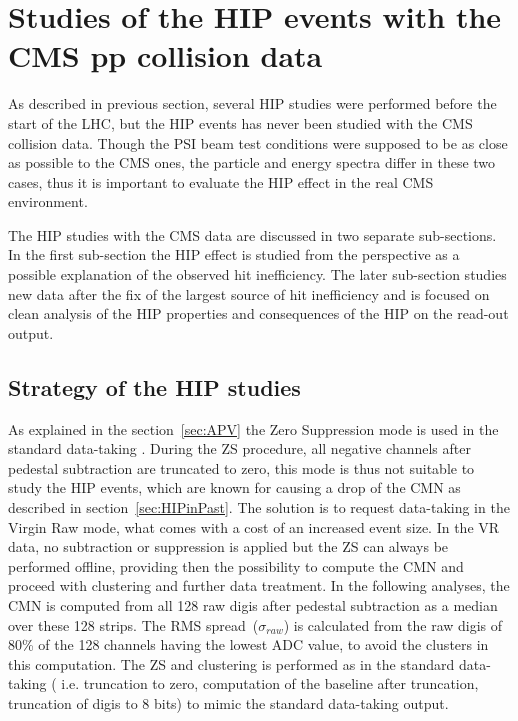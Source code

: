 \section{Studies of the HIP events with the CMS pp collision data}

As described in previous section, several HIP studies were performed before the start of the LHC, but the HIP events has never been studied with the CMS collision data. Though the PSI beam test conditions were supposed to be as close as possible to the CMS ones, the particle and energy spectra differ in these two cases, thus it is important to evaluate the HIP effect in the real CMS environment.

The HIP studies with the CMS data are discussed in two separate sub-sections. In the first sub-section the HIP effect is studied from the perspective as a possible explanation of the observed hit inefficiency. The later sub-section studies new data after the fix of the largest source of hit inefficiency and is focused on clean analysis of the HIP properties and consequences of the HIP on the read-out output.

\subsection{Strategy of the HIP studies}

As explained in the section~\ref{sec:APV} the Zero Suppression mode is used in the standard data-taking . During the ZS procedure, all negative channels after pedestal subtraction are truncated to zero, this mode is thus not suitable to study the HIP events, which are known for causing a drop of the CMN as described in section~\ref{sec:HIPinPast}. The solution is to request data-taking in the Virgin Raw mode, what comes with a cost of an increased event size. In the VR data, no subtraction or suppression is applied but the ZS can always be performed offline, providing then the possibility to compute the CMN and proceed with clustering and further data treatment. In the following analyses, the CMN is computed from all 128 raw digis after pedestal subtraction as a median over these 128 strips. The RMS spread~($\sigma_{raw}$) is calculated from the raw digis of 80\% of the 128 channels having the lowest ADC value, to avoid the clusters in this computation. The ZS and clustering is performed as in the standard data-taking ( i.e. truncation to zero, computation of the baseline after truncation, truncation of digis to 8 bits) to mimic the standard data-taking output.

